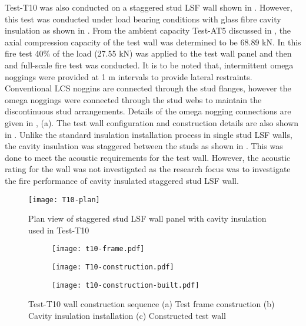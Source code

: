 Test-T10 was also conducted on a staggered stud LSF wall shown in . However, this test was conducted under load bearing conditions with glass fibre cavity insulation as shown in . From the ambient capacity Test-AT5 discussed in , the axial compression capacity of the test wall was determined to be 68.89 kN. In this fire test 40\% of the load (27.55 kN) was applied to the test wall panel and then and full-scale fire test was conducted. It is to be noted that, intermittent omega noggings were provided at 1 m intervals to provide lateral restraints. Conventional LCS noggins are connected through the stud flanges, however the omega noggings were connected through the stud webs to maintain the discontinuous stud arrangements. Details of the omega nogging connections are given in ,  (a). The test wall configuration and construction details are also shown in . Unlike the standard insulation installation process in single stud LSF walls, the cavity insulation was staggered between the studs as shown in . This was done to meet the acoustic requirements for the test wall. However, the acoustic rating for the wall was not investigated as the research focus was to investigate the fire performance of cavity insulated staggered stud LSF wall. 
\begin{figure}[!htbp]
	\centering
		\texttt{[image: T10-plan]}
		\caption{Plan view of staggered stud LSF wall panel with cavity insulation used in Test-T10}
		\label{fig:T10-plan}
\end{figure}
\begin{figure}[!htbp]
	\centering
	\begin{subfigure}[b]{0.5\textwidth}
		\centering
		\texttt{[image: t10-frame.pdf]}
		\caption{}
		\label{subfig:t10-frame}
	\end{subfigure}
	\begin{subfigure}[b]{0.5\textwidth}
		\centering
		\texttt{[image: T10-construction.pdf]}
		\caption{}
		\label{subfig:T10-construction}
	\end{subfigure}
	\begin{subfigure}[b]{0.5\textwidth}
		\centering
		\texttt{[image: t10-construction-built.pdf]}
		\label{subfig:t10-construction-built}
	\end{subfigure}
	\caption{Test-T10 wall construction sequence (a) Test frame construction (b) Cavity insulation installation (c) Constructed test wall}
	\label{fig:t10-construction-sequence}
\end{figure}

